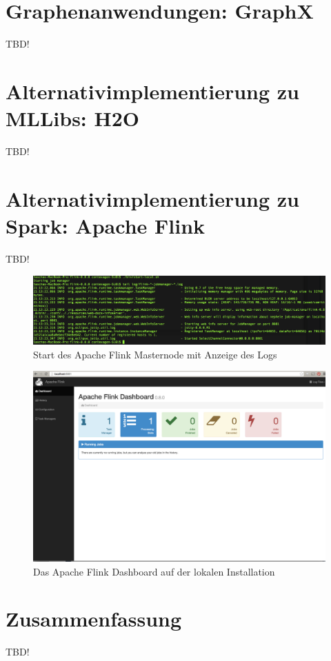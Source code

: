 \section{Graphenanwendungen: GraphX}
\label{section:graphx}

TBD!


\section{Alternativimplementierung zu MLLibs: H2O}
\label{section:h2o}

TBD!

\section{Alternativimplementierung zu Spark: Apache Flink}
\label{section:flink}

TBD!

\begin{figure}[htb!]
\centering
\includegraphics[width=1.0\textwidth]{bilder/flink1.png}
\caption{Start des Apache Flink Masternode mit Anzeige des Logs }
\label{fig:flink start]}
\end{figure} 



\begin{figure}[htb!]
\centering
\includegraphics[width=1.0\textwidth]{bilder/flink2.png}
\caption{Das Apache Flink Dashboard auf der lokalen Installation}
\label{fig:flink dashboard]}
\end{figure} 




\section{Zusammenfassung}
\label{section:zusammen}



TBD!
